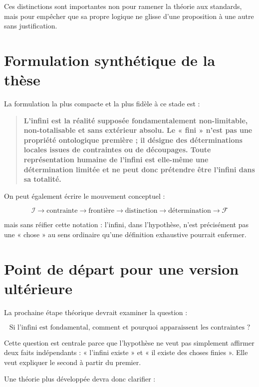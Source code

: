 \documentclass[11pt,a4paper]{article}
\newcommand{\Inf}{\mathcal I}
\newcommand{\Fin}{\mathcal F}
\begin{document}
Ces distinctions sont importantes non pour ramener la théorie aux standards, mais pour empêcher que sa propre logique ne glisse d'une proposition à une autre sans justification.

\section{Formulation synthétique de la thèse}

La formulation la plus compacte et la plus fidèle à ce stade est :

\begin{quote}
\textbf{L'infini est la réalité supposée fondamentalement non-limitable, non-totalisable et sans extérieur absolu. Le « fini » n'est pas une propriété ontologique première ; il désigne des déterminations locales issues de contraintes ou de découpages. Toute représentation humaine de l'infini est elle-même une détermination limitée et ne peut donc prétendre être l'infini dans sa totalité.}
\end{quote}

On peut également écrire le mouvement conceptuel :

\[
\boxed{
\Inf
\rightarrow
\text{contrainte}
\rightarrow
\text{frontière}
\rightarrow
\text{distinction}
\rightarrow
\text{détermination}
\rightarrow
\Fin
}
\]

mais sans réifier cette notation : l'infini, dans l'hypothèse, n'est précisément pas une « chose » au sens ordinaire qu'une définition exhaustive pourrait enfermer.

\section{Point de départ pour une version ultérieure}

La prochaine étape théorique devrait examiner la question :

\[
\boxed{
\text{Si l'infini est fondamental, comment et pourquoi apparaissent les contraintes ?}
}
\]

Cette question est centrale parce que l'hypothèse ne veut pas simplement affirmer deux faits indépendants : « l'infini existe » et « il existe des choses finies ». Elle veut expliquer le second à partir du premier.

Une théorie plus développée devra donc clarifier :
\end{document}
